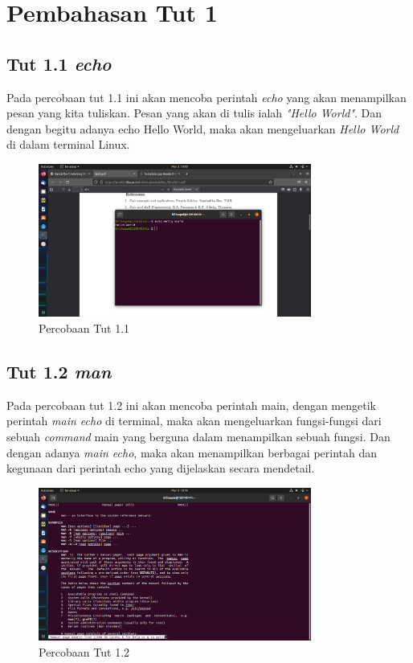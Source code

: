 \documentclass[11pt,a4paper]{article}
\begin{document}
\section{Pembahasan Tut 1}
\subsection{Tut 1.1 \textit{echo}}
	Pada percobaan tut 1.1 ini akan mencoba perintah \textit{echo} yang akan menampilkan pesan yang kita tuliskan. Pesan yang akan 
	di tulis ialah \textit{"Hello World"}. Dan dengan begitu adanya echo Hello World, maka akan mengeluarkan \textit{Hello World} 
	di dalam terminal Linux.
	\begin{figure}[h]
		\centering
		\includegraphics[width=0.8\textwidth]{Figure/tut 1.1.png}
		\caption{Percobaan Tut 1.1}
	\end{figure}

\subsection{Tut 1.2 \textit{man}}
    Pada percobaan tut 1.2 ini akan mencoba perintah main, dengan mengetik perintah \textit{main echo} di terminal, maka akan 
	mengeluarkan fungsi-fungsi dari sebuah \textit{command} main yang berguna dalam menampilkan sebuah fungsi. Dan dengan adanya \textit{main echo},
	maka akan menampilkan berbagai perintah dan kegunaan dari perintah echo yang dijelaskan secara mendetail.
	\begin{figure}[h]
		\centering
		\includegraphics[width=0.8\textwidth]{Figure/tut 1.2.png}
		\caption{Percobaan Tut 1.2}
	\end{figure}
\end{document}
